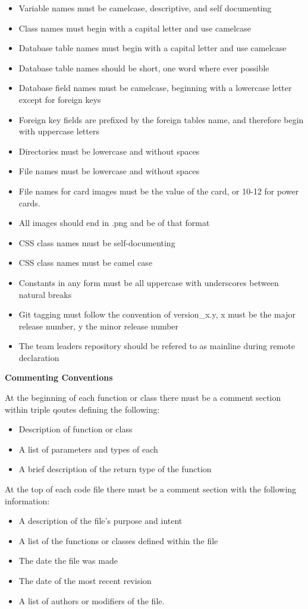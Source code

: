 \documentclass[12pt]{IEEEtran}
\begin{document}
	\begin{itemize}
		\item Variable names must be camelcase, descriptive, and self documenting
		\item Class names must begin with a capital letter and use camelcase 
		\item Database table names must begin with a capital letter and use camelcase
		\item Database table names should be short, one word where ever possible
		\item Database field names must be camelcase, beginning with a lowercase letter except for foreign keys
		\item Foreign key fields are prefixed by the foreign tables name, and therefore begin with uppercase letters
		\item Directories must be lowercase and without spaces
		\item File names must be lowercase and without spaces
		\item File names for card images must be the value of the card, or 10-12 for power cards.
		\item All images should end in .png and be of that format
		\item CSS class names must be self-documenting
		\item CSS class names must be camel case
		\item Constants in any form must be all uppercase with underscores between natural breaks
		\item Git tagging must follow the convention of version\_x.y, x must be the major release number, y the minor 					release number
		\item The team leaders repository should be refered to as mainline during remote declaration
	\end{itemize}

	\bfseries Commenting Conventions \mdseries

	At the beginning of each function or class there must be a comment section within triple qoutes defining the following:
	\begin{itemize}
		\item Description of function or class
		\item A list of parameters and types of each
		\item A brief description of the return type of the function
	\end{itemize}

	At the top of each code file there must be a comment section with the following information:
	\begin{itemize}
		\item A description of the file's purpose and intent
		\item A list of the functions or classes defined within the file
		\item The date the file was made
		\item The date of the most recent revision
		\item A list of authors or modifiers of the file. 
	\end{itemize}
\end{document}
